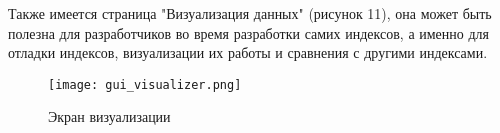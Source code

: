 Также имеется страница "Визуализация данных" (рисунок 11), она может быть полезна для разработчиков во время разработки самих индексов, а именно для отладки индексов, визуализации их работы и сравнения с другими индексами. 
\begin{figure}[h]
    \centering
    \texttt{[image: gui\_visualizer.png]}
    \caption{Экран визуализации}
\end{figure}